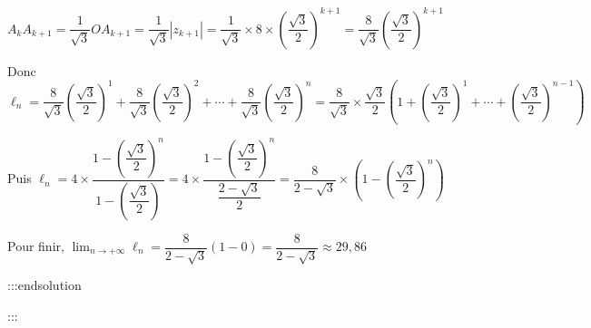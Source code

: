 \documentclass{cornouaille}
\begin{document}
\begin{enumerate}
\begin{enumerate}
$A_kA_{k+1} = \dfrac{1}{\sqrt{3}} OA_{k+1} = \dfrac{1}{\sqrt{3}} \left|z_{k+1} \right| = \dfrac{1}{\sqrt{3}} \times 8 \times \left( \dfrac{\sqrt{3}}{2} \right)^{k+1} = \dfrac{8}{\sqrt{3}} \left( \dfrac{\sqrt{3}}{2} \right)^{k+1}$ \medskip

Donc $\ell_n=\dfrac{8}{\sqrt{3}} \left( \dfrac{\sqrt{3}}{2} \right)^1 + \dfrac{8}{\sqrt{3}} \left( \dfrac{\sqrt{3}}{2} \right)^2 + \cdots + \dfrac{8}{\sqrt{3}} \left( \dfrac{\sqrt{3}}{2} \right)^n
= \dfrac{8}{\sqrt{3}} \times \dfrac{\sqrt{3}}{2} \left( 1 +  \left( \dfrac{\sqrt{3}}{2} \right)^1 + \cdots + \left( \dfrac{\sqrt{3}}{2} \right)^{n-1} \right)$\medskip

Puis $\ell_n=4 \times \dfrac{1 - \left( \dfrac{\sqrt{3}}{2} \right)^{n} }{1-\left( \dfrac{\sqrt{3}}{2} \right)}
=4 \times \dfrac{1 - \left( \dfrac{\sqrt{3}}{2} \right)^{n} }{\dfrac{2-\sqrt{3}}{2}}
=\dfrac{8}{2-\sqrt{3}} \times \left( 1 - \left( \dfrac{\sqrt{3}}{2} \right)^{n} \right)$\medskip

Pour finir, $\displaystyle\lim_{n \to + \infty} \ell_n=\dfrac{8}{2-\sqrt{3}}(1-0) =\dfrac{8}{2-\sqrt{3}} \approx 29,86$


:::endsolution
\end{enumerate}

\end{enumerate}

:::
\end{document}
